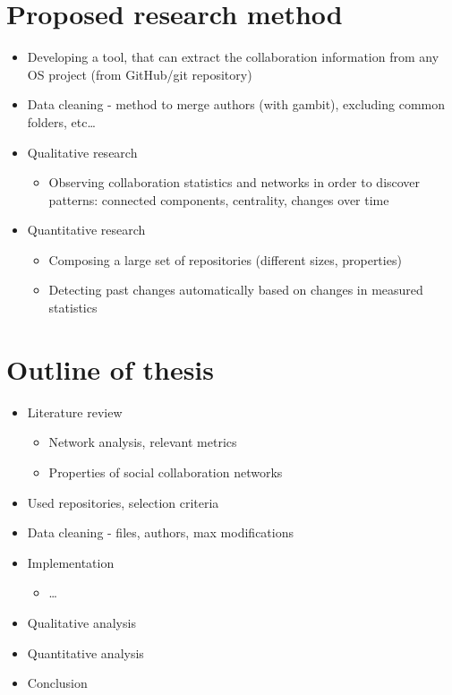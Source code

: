 \section{Proposed research method}

\begin{itemize}
    \item Developing a tool, that can extract the collaboration information from any OS project (from GitHub/git repository)
    \item Data cleaning - method to merge authors (with gambit), excluding common folders, etc\dots
    \item Qualitative research
    \begin{itemize}
        \item Observing collaboration statistics and networks in order to discover patterns: connected components, centrality, changes over time
    \end{itemize}
    \item Quantitative research
    \begin{itemize}
        \item Composing a large set of repositories (different sizes, properties)
        \item Detecting past changes automatically based on changes in measured statistics
    \end{itemize}
\end{itemize}

\section{Outline of thesis}
\begin{itemize}
    \item Literature review
    \begin{itemize}
        \item Network analysis, relevant metrics
        \item Properties of social collaboration networks
    \end{itemize}
    \item Used repositories, selection criteria
    \item Data cleaning - files, authors, max modifications
    \item Implementation
    \begin{itemize}
        \item \dots
    \end{itemize}
    \item Qualitative analysis
    \item Quantitative analysis
    \item Conclusion
\end{itemize}

